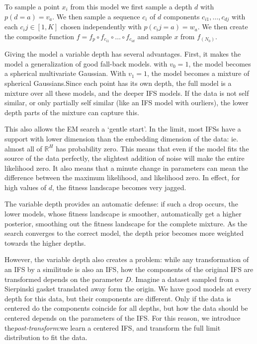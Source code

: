 \documentclass[10pt,a4paper,oneside]{article}
\theoremstyle{definition}
\newcommand{\R}{\mathbb{R}}
\theoremstyle{definition}
\begin{document}
To sample a point $x_i$ from this model we first sample a depth $d$ with $p(d=a) = v_a$. We then sample a sequence $c_i$ of $d$ components $c_{i1}, \ldots, c_{dj}$ with each $c_ij \in [1,K]$ chosen independently with $p(c_ij = a) = w_a$. We then create the composite function $f = f_p \circ f_{c_{i1}} \circ \ldots \circ f_{c_{id}}$ and sample $x$ from $f_(N_0)$.

Giving the model a variable depth has several advantages. First, it makes the model a generalization of good fall-back models. with $v_0 = 1$, the model becomes a spherical multivariate Gaussian. With $v_1 = 1$, the model becomes a mixture of spherical Gaussians.\footnotemark Since each point has its own depth, the full model is a mixture over all these models, and the deeper IFS models. If the data is not self similar, or only partially self similar (like an IFS model with ourliers), the lower depth parts of the mixture can capture this.

This also allows the EM search a `gentle start'. In the limit, most IFSs have a support with lower dimension than the embedding dimension of the data: ie. almost all of $\R^H$ has probability zero. This means that even if the model fits the source of the data perfectly, the slightest addition of noise will make the entire likelihood zero. It also means that a minute change in parameters can mean the difference between the maximum likelihood, and likelihood zero. In effect, for high values of $d$, the fitness landscape becomes very jagged. 

The variable depth provides an automatic defense: if such a drop occurs, the lower models, whose fitness landscape is smoother, automatically get a higher posterior, smoothing out the fitness landscape for the complete mixture. As the search converges to the correct model, the depth prior becomes more weighted towards the higher depths.

However, the variable depth also creates a problem: while any transformation of an IFS by a similitude is also an IFS, how the components of the original IFS are transformed depends on the parameter $D$. Imagine a dataset sampled from a Sierpinski gasket translated away form the origin. We have good models at every depth for this data, but their components are different. Only if the data is centered do the components coincide for all depths, but how the data should be centered depends on the parameters of the IFS. For this reason, we introduce the\emph{post-transform}:we learn a centered IFS, and transform the full limit distribution to fit the data.   
\end{document}
